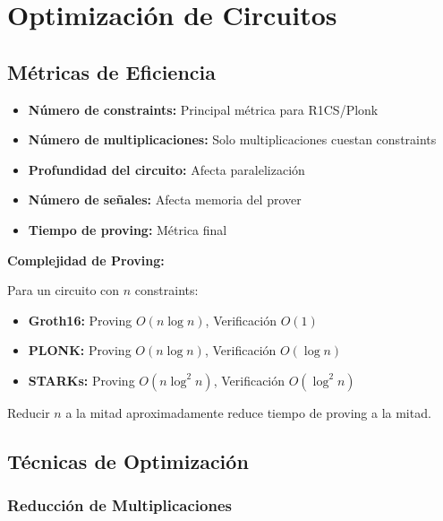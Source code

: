 \documentclass[11pt,a4paper,twoside]{book}
\begin{document}
\section{Optimizaci\'on de Circuitos}
\label{sec:circuit-optimization}

\subsection{M\'etricas de Eficiencia}

\begin{definition}
\begin{itemize}
    \item \textbf{N\'umero de constraints:} Principal m\'etrica para R1CS/Plonk
    \item \textbf{N\'umero de multiplicaciones:} Solo multiplicaciones cuestan constraints
    \item \textbf{Profundidad del circuito:} Afecta paralelizaci\'on
    \item \textbf{N\'umero de se\~nales:} Afecta memoria del prover
    \item \textbf{Tiempo de proving:} M\'etrica final
\end{itemize}
\end{definition}

\begin{mathnote}
\textbf{Complejidad de Proving:}

Para un circuito con $n$ constraints:
\begin{itemize}
    \item \textbf{Groth16:} Proving $O(n \log n)$, Verificaci\'on $O(1)$
    \item \textbf{PLONK:} Proving $O(n \log n)$, Verificaci\'on $O(\log n)$
    \item \textbf{STARKs:} Proving $O(n \log^2 n)$, Verificaci\'on $O(\log^2 n)$
\end{itemize}

Reducir $n$ a la mitad aproximadamente reduce tiempo de proving a la mitad.
\end{mathnote}

\subsection{T\'ecnicas de Optimizaci\'on}

\subsubsection{Reducci\'on de Multiplicaciones}
\end{document}

